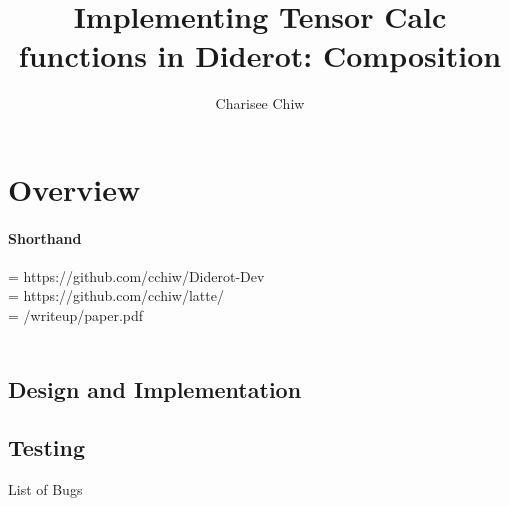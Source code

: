 \documentclass{article}
\title{Implementing Tensor Calc functions in Diderot: Composition}
\author{Charisee Chiw}
\begin{document}
\maketitle 
\section{Overview}

\paragraph{Shorthand}
\branch{} =  https://github.com/cchiw/Diderot-Dev\\
\exs{}  = https://github.com/cchiw/latte/\\
\doc{} = \exs{}/writeup/paper.pdf\\
\\




\subsection{Design and Implementation}

\subsection{Testing}
List of Bugs







 
\end{document}
